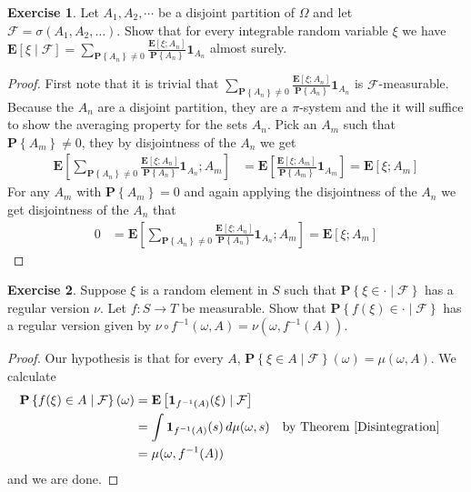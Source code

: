 \documentclass{amsbook}
\theoremstyle{definition}
\newtheorem{xca}{Exercise}
\theoremstyle{remark}
\newcommand{\expectation}[1]{\textbf{E}\left[#1\right]}
\newcommand{\cexpectationlong}[2]{\textbf{E}\left[ #2 \mid #1 \right]}
\newcommand{\probability}[1]{\textbf{P}\left \{#1 \right \}}
\newcommand{\cprobability}[2]{\textbf{P} \left \{#2 \mid #1 \right \}}
\newcommand{\characteristic}[1]{\textbf{1}_{#1}}
\newcommand{\pushforward}[2]{#2 \circ #1^{-1}}
\begin{document}
\begin{xca}Let $A_1, A_2, \cdots$ be a disjoint partition of $\Omega$
  and let $\mathcal{F} = \sigma(A_1, A_2, \dots)$.  Show that for
  every integrable random variable $\xi$ we have
$\cexpectationlong{\mathcal{F}}{\xi} = \sum_{\probability{A_n} \neq 0}
\frac{\expectation{\xi ; A_n}}{\probability{A_n}} \characteristic{A_n}$ almost surely.
\end{xca}
\begin{proof}First note that it is trivial that $\sum_{\probability{A_n} \neq 0}
\frac{\expectation{\xi ; A_n}}{\probability{A_n}}\characteristic{A_n}$ is
$\mathcal{F}$-measurable.  Because the $A_n$ are a disjoint partition,
  they are a $\pi$-system and the it will suffice to show the
  averaging property for the sets $A_n$.
Pick an $A_m$ such that $\probability{A_m} \neq 0$, they by
disjointness of the $A_n$ we get
\begin{align*}
\expectation{\sum_{\probability{A_n} \neq 0}
\frac{\expectation{\xi ; A_n}}{\probability{A_n}}
\characteristic{A_n}; A_m} &= \expectation{\frac{\expectation{\xi ;
    A_m}}{\probability{A_m}} \characteristic{A_m}} = \expectation{\xi ; A_m}
\end{align*}
For any $A_m$ with $\probability{A_m} = 0$ and again applying the
disjointness of the $A_n$ we get
disjointness of the $A_n$ that 
\begin{align*}
0 &= \expectation{\sum_{\probability{A_n} \neq 0}
\frac{\expectation{\xi ; A_n}}{\probability{A_n}}
\characteristic{A_n}; A_m}  = \expectation{\xi ; A_m}
\end{align*}
\end{proof}

\begin{xca}\label{PushforwardRegularVersion}Suppose $\xi$ is a random element in $S$ such that
  $\cprobability{\mathcal{F}}{\xi \in \cdot}$ has a regular version
  $\nu$.  Let $f : S \to T$ be measurable.  Show that
  $\cprobability{\mathcal{F}}{f(\xi) \in \cdot}$ has a regular version
  given by $\pushforward{f} {\nu} (\omega, A) = \nu(\omega, f^{-1}(A))$.
\end{xca}
\begin{proof}
Our hypothesis is that for every $A$, $\cprobability{\mathcal{F}}{\xi
  \in A}(\omega) = \mu(\omega, A)$.  We calculate 
\begin{align*}
\cprobability{\mathcal{F}}{f(\xi) \in A}(\omega) &=
\cexpectationlong{\mathcal{F}}{\characteristic{f^{-1}(A)}(\xi)} \\
&=\int \characteristic{f^{-1}(A)}(s) \, d\mu(\omega, s) & & \text{by
  Theorem \ref{Disintegration}} \\
&=\mu(\omega, f^{-1}(A))
\end{align*}
and we are done.
\end{proof}
\end{document}
